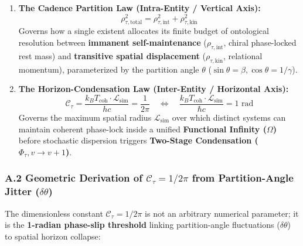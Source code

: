 \documentclass[
]{article}
\begin{document}
\begin{enumerate}
\def\labelenumi{\arabic{enumi}.}
\item
  \textbf{The Cadence Partition Law (Intra-Entity / Vertical Axis):}
  \[\rho_{\tau,\text{total}}^2 = \rho_{\tau,\text{int}}^2 + \rho_{\tau,\text{kin}}^2\]
  Governs how a single existent allocates its finite budget of
  ontological resolution between \textbf{immanent self-maintenance}
  (\(\rho_{\tau,\text{int}}\), chiral phase-locked rest mass) and
  \textbf{transitive spatial displacement} (\(\rho_{\tau,\text{kin}}\),
  relational momentum), parameterized by the partition angle \(\theta\)
  (\(\sin\theta = \beta, \cos\theta = 1/\gamma\)).
\item
  \textbf{The Horizon-Condensation Law (Inter-Entity / Horizontal
  Axis):}
  \[\mathcal{C}_\tau = \frac{k_B T_{\text{coh}} \cdot \mathcal{L}_{\text{sim}}}{h c} = \frac{1}{2\pi} \quad \Longleftrightarrow \quad \frac{k_B T_{\text{coh}} \cdot \mathcal{L}_{\text{sim}}}{\hbar c} = 1\text{ rad}\]
  Governs the maximum spatial radius \(\mathcal{L}_{\text{sim}}\) over
  which distinct systems can maintain coherent phase-lock inside a
  unified \textbf{Functional Infinity (\(\Omega\))} before stochastic
  dispersion triggers \textbf{Two-Stage Condensation
  (\(\Phi_\tau, v \to v + 1\))}.
\end{enumerate}

\subsubsection{\texorpdfstring{A.2 Geometric Derivation of
\(\mathcal{C}_\tau = 1/2\pi\) from Partition-Angle Jitter
(\(\delta\theta\))}{A.2 Geometric Derivation of \textbackslash mathcal\{C\}\_\textbackslash tau = 1/2\textbackslash pi from Partition-Angle Jitter (\textbackslash delta\textbackslash theta)}}\label{a.2-geometric-derivation-of-mathcalc_tau-12pi-from-partition-angle-jitter-deltatheta}

The dimensionless constant \(\mathcal{C}_\tau = 1/2\pi\) is not an
arbitrary numerical parameter; it is the \textbf{1-radian phase-slip
threshold} linking partition-angle fluctuations (\(\delta\theta\)) to
spatial horizon collapse:
\end{document}
